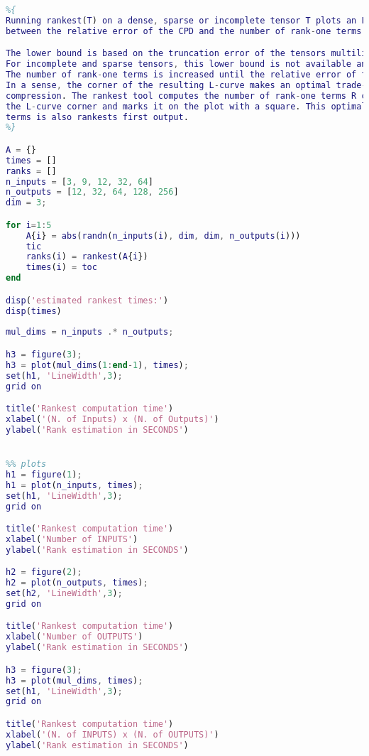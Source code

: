 \begin{lstlisting}[language={Matlab}]
%% Rankest performance evaluation 
%{
Running rankest(T) on a dense, sparse or incomplete tensor T plots an L-curve which represents the balance
between the relative error of the CPD and the number of rank-one terms R. 

The lower bound is based on the truncation error of the tensors multilinear singular values 
For incomplete and sparse tensors, this lower bound is not available and the first value to be tried for R is 1. 
The number of rank-one terms is increased until the relative error of the approximation is less than options.MinRelErr. 
In a sense, the corner of the resulting L-curve makes an optimal trade-off between accuracy and
compression. The rankest tool computes the number of rank-one terms R corresponding to
the L-curve corner and marks it on the plot with a square. This optimal number of rank-one
terms is also rankests first output.
%}

A = {}
times = []
ranks = []
n_inputs = [3, 9, 12, 32, 64]
n_outputs = [12, 32, 64, 128, 256]
dim = 3; 

for i=1:5
    A{i} = abs(randn(n_inputs(i), dim, dim, n_outputs(i)))
    tic
    ranks(i) = rankest(A{i})
    times(i) = toc
end 

disp('estimated rankest times:') 
disp(times)
 
mul_dims = n_inputs .* n_outputs; 

h3 = figure(3);
h3 = plot(mul_dims(1:end-1), times);
set(h1, 'LineWidth',3);
grid on

title('Rankest computation time') 
xlabel('(N. of Inputs) x (N. of Outputs)') 
ylabel('Rank estimation in SECONDS') 


%% plots 
h1 = figure(1); 
h1 = plot(n_inputs, times);
set(h1, 'LineWidth',3);
grid on

title('Rankest computation time') 
xlabel('Number of INPUTS') 
ylabel('Rank estimation in SECONDS') 

h2 = figure(2); 
h2 = plot(n_outputs, times); 
set(h2, 'LineWidth',3);
grid on

title('Rankest computation time') 
xlabel('Number of OUTPUTS') 
ylabel('Rank estimation in SECONDS') 

h3 = figure(3);
h3 = plot(mul_dims, times);
set(h1, 'LineWidth',3);
grid on

title('Rankest computation time') 
xlabel('(N. of INPUTS) x (N. of OUTPUTS)') 
ylabel('Rank estimation in SECONDS') 

\end{lstlisting}

